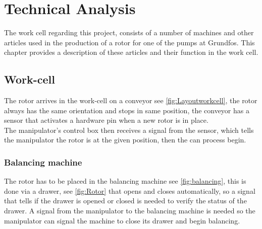  \chapter{Technical Analysis} \label{TechAnalysis}
 
The work cell regarding this project, consists of a number of machines and other articles used in the production of a rotor for one of the pumps at Grundfos. This chapter provides a description of these articles and their function in the work cell\cite{robotsave}.\\
 

 \section{Work-cell}
 The rotor arrives in the work-cell on a conveyor see \ref{fig:Layoutworkcell}, the rotor always has the same orientation and stops in same position, the conveyor has a sensor that activates a hardware pin when a new rotor is in place.\\
 The manipulator's control box then receives a signal from the sensor, which tells the manipulator the rotor is at the given position, then the can process begin.\\


 
 \subsection{Balancing machine}
 The rotor has to be placed in the balancing machine see \ref{fig:balancing}, this is done via a drawer, see \ref{fig:Rotor} that opens and closes automatically, so a signal that tells if the drawer is opened or closed is needed to verify the status of the drawer. A signal from the manipulator to the balancing machine is needed so the manipulator can signal the machine to close its drawer and begin balancing.\\
 
